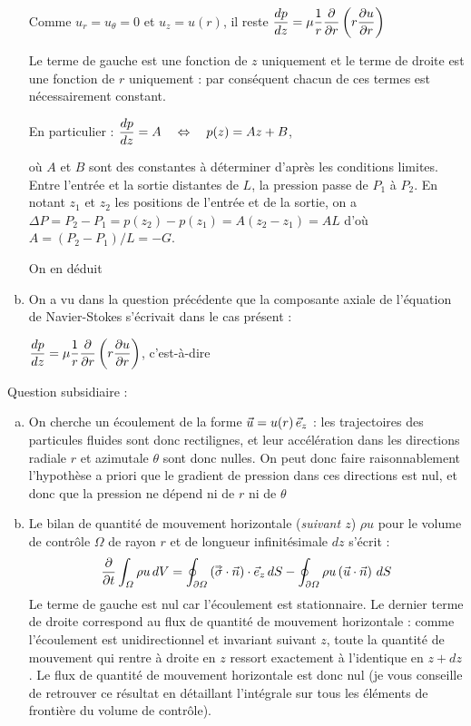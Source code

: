 \documentclass[10pt, a4paper]{article}
\renewcommand{\myvec}[1]{\vec{#1}}
\begin{document}
\begin{myenumerate}
\begin{enumerate}[a)]
\medskip
Comme $u_r = u_\theta = 0$ et $u_z = u(r)$, il reste
\dotfill 
$\displaystyle \frac{d p}{dz} = \mu \displaystyle \frac{1}{r} \displaystyle \frac{\partial }{\partial r} \left ( r \displaystyle \frac{\partial u}{\partial r} \right )$

Le terme de gauche est une fonction de $z$ uniquement et le terme de droite est une fonction de $r$ uniquement : 
par conséquent chacun de ces termes est nécessairement constant.

\medskip
En particulier  : \qquad
$\displaystyle \frac{d p}{dz} = A \quad \Leftrightarrow \quad p(z) = Az+B$,

\medskip
où $A$ et $B$ sont des constantes à déterminer d'après les conditions limites.
Entre l'entrée et la sortie distantes de $L$, la pression passe de $P_1$ à $P_2$.
En notant $z_1$ et $z_2$ les positions de l'entrée et de la sortie, on a
$\Delta P = P_2 - P_1 = p(z_2) - p(z_1) = A (z_2-z_1) = AL$
d'où $A = (P_2-P_1)/L = -G$.

\medskip
On en déduit
\dotfill
{}

\medskip
\item
On a vu dans la question précédente que la composante axiale de l'équation de Navier-Stokes
s'écrivait dans le cas présent :

\medskip
$\displaystyle \frac{d p}{dz} = \mu \displaystyle \frac{1}{r} \displaystyle \frac{\partial }{\partial r} \left ( r \displaystyle \frac{\partial u}{\partial r} \right )$,
c'est-à-dire
\dotfill
{}
\end{enumerate}

\medskip
\item
	Question subsidiaire :
\begin{enumerate}[a)]
\item 
	On cherche un écoulement de la forme $\myvec{u} = u(r) \, \ez$ : les trajectoires des
	particules fluides sont donc rectilignes, et leur accélération dans les directions radiale $r$
	et azimutale $\theta$ sont donc nulles. 
	On peut donc faire raisonnablement l'hypothèse a priori 
	que le gradient de pression dans ces directions est nul, et donc que la pression ne dépend
	ni de $r$ ni de $\theta$
	\dotfill
\item
	Le bilan de quantité de mouvement horizontale (\textsl{suivant $z$}) 
	$\rho u$ pour le volume de contrôle $\varOmega$
	de rayon $r$ et de longueur infinitésimale $dz$ s'écrit :
	\[
		\dpdt{} \int_\varOmega \rho u \, dV
		=
		\oint_{\partial \varOmega}
		\left (\mytensor{\sigma} \cdot \myvec{n} \right ) \cdot \ez \, dS
		- 
		\oint_{\partial \varOmega}
		\rho u \left ( \myvec{u} \cdot \myvec{n} \right ) \, dS
	\]
	Le terme de gauche est nul car l'écoulement est stationnaire.
	Le dernier terme de droite correspond au flux de quantité de mouvement horizontale : 
	comme l'écoulement est unidirectionnel et invariant suivant $z$, toute la quantité de mouvement 
	qui rentre à droite en $z$ ressort exactement à l'identique en $z+dz$.
	Le flux de quantité de mouvement horizontale est donc nul (je vous conseille de 
	retrouver ce résultat en détaillant 
	l'intégrale sur tous les éléments de frontière du volume de contrôle).
	

\end{enumerate}
\end{myenumerate}
\end{document}
